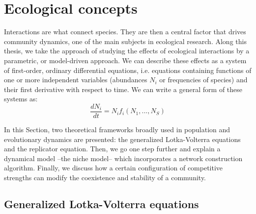 \section{Ecological concepts}\label{chp:methods:ecointeract}

 Interactions are what connect species. They are then a central factor that drives community dynamics, one of the main subjects in ecological research. Along this thesis, we take the approach of studying the effects of ecological interactions by a parametric, or model-driven approach. We can describe these effects as a system of first-order, ordinary differential equations, i.e. equations containing functions of one or more independent variables (abundances $N_i$ or frequencies of species) and their first derivative with respect to time. We can write a general form of these systems as:
 \begin{equation}
     \frac{dN_i}{dt} = N_i f_i(N_1,... , N_S)
 \end{equation}


 In this Section, two theoretical frameworks broadly used in population and evolutionary dynamics are presented: the generalized Lotka-Volterra equations and the replicator equation. Then, we go one step further and explain a dynamical model --the niche model-- which incorporates a network construction algorithm. Finally, we discuss how a certain configuration of competitive strengths can modify the coexistence and stability of a community.

\subsection{Generalized Lotka-Volterra equations}\label{chp:methods:LV}


